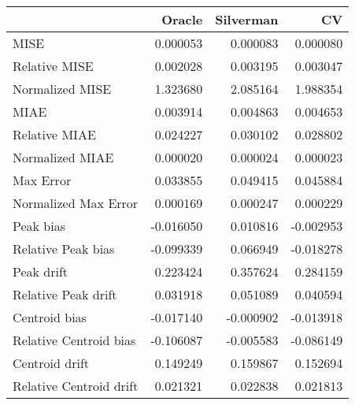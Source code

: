 \begin{tabular}{lrrr}
  \hline
 & Oracle & Silverman & CV \\ 
  \hline
MISE & 0.000053 & 0.000083 & 0.000080 \\ 
  Relative MISE & 0.002028 & 0.003195 & 0.003047 \\ 
  Normalized MISE & 1.323680 & 2.085164 & 1.988354 \\ 
  MIAE & 0.003914 & 0.004863 & 0.004653 \\ 
  Relative MIAE & 0.024227 & 0.030102 & 0.028802 \\ 
  Normalized MIAE & 0.000020 & 0.000024 & 0.000023 \\ 
  Max Error & 0.033855 & 0.049415 & 0.045884 \\ 
  Normalized Max Error & 0.000169 & 0.000247 & 0.000229 \\ 
  Peak bias & -0.016050 & 0.010816 & -0.002953 \\ 
  Relative Peak bias & -0.099339 & 0.066949 & -0.018278 \\ 
  Peak drift & 0.223424 & 0.357624 & 0.284159 \\ 
  Relative Peak drift & 0.031918 & 0.051089 & 0.040594 \\ 
  Centroid bias & -0.017140 & -0.000902 & -0.013918 \\ 
  Relative Centroid bias & -0.106087 & -0.005583 & -0.086149 \\ 
  Centroid drift & 0.149249 & 0.159867 & 0.152694 \\ 
  Relative Centroid drift & 0.021321 & 0.022838 & 0.021813 \\ 
   \hline
\end{tabular}
